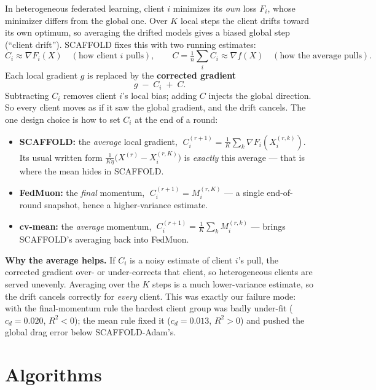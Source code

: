 \documentclass[11pt]{article}
\newcommand{\gF}{\nabla F_i}
\begin{document}
In heterogeneous federated learning, client $i$ minimizes its \emph{own} loss $F_i$,
whose minimizer differs from the global one. Over $K$ local steps the client drifts
toward its own optimum, so averaging the drifted models gives a biased global step
(``client drift''). SCAFFOLD fixes this with two running estimates:
\[
  C_i \approx \nabla F_i(X)\quad(\text{how client $i$ pulls}),
  \qquad
  C=\tfrac1n\textstyle\sum_i C_i \approx \nabla f(X)\quad(\text{how the average pulls}).
\]
Each local gradient $g$ is replaced by the \textbf{corrected gradient}
\[
  g \;-\; C_i \;+\; C .
\]
Subtracting $C_i$ removes client $i$'s local bias; adding $C$ injects the global
direction. So every client moves as if it saw the global gradient, and the drift
cancels. The one design choice is how to set $C_i$ at the end of a round:
\begin{itemize}
  \item \textbf{SCAFFOLD:} the \emph{average} local gradient,
        $\;C_i^{(r+1)}=\frac1K\sum_{k}\gF(X_i^{(r,k)})$.
        Its usual written form $\frac{1}{K\eta}\big(X^{(r)}-X_i^{(r,K)}\big)$ is
        \emph{exactly} this average --- that is where the mean hides in SCAFFOLD.
  \item \textbf{FedMuon:} the \emph{final} momentum, $\;C_i^{(r+1)}=M_i^{(r,K)}$ ---
        a single end-of-round snapshot, hence a higher-variance estimate.
  \item \textbf{cv-mean:} the \emph{average} momentum,
        $\;C_i^{(r+1)}=\frac1K\sum_k M_i^{(r,k)}$ --- brings SCAFFOLD's averaging
        back into FedMuon.
\end{itemize}
\textbf{Why the average helps.} If $C_i$ is a noisy estimate of client $i$'s pull,
the corrected gradient over- or under-corrects that client, so heterogeneous clients
are served unevenly. Averaging over the $K$ steps is a much lower-variance estimate,
so the drift cancels correctly for \emph{every} client. This was exactly our failure
mode: with the final-momentum rule the hardest client group was badly under-fit
($c_d\!=\!0.020$, $R^2\!<\!0$); the mean rule fixed it ($c_d\!=\!0.013$, $R^2\!>\!0$)
and pushed the global drag error below SCAFFOLD-Adam's.

\section*{Algorithms}
\end{document}
